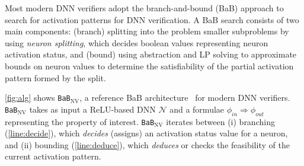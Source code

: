 \documentclass[oneside,11pt,dvipsnames]{book}
\newcommand{\nnproofformat}{\texttt{APTP}}
\newcommand{\dd}{\texttt{BaB$_{\text{NV}}$}}
\begin{document}
\begin{algorithm}[t]
{    }\label{line:dpllend}
    \Return{\unsat}
    
    \caption{The \dd{} algorithm.}\label{fig:alg}
\end{algorithm}

Most modern DNN verifiers adopt the branch-and-bound (BaB) approach to search for activation patterns for DNN verification. A BaB search consists of two main components: (branch) splitting into the problem smaller subproblems 
by using \emph{neuron splitting}, which decides boolean values representing neuron activation status, 
and (bound) using abstraction and LP solving to approximate bounds on neuron values to determine 
the satisfiability of the partial activation pattern formed by the split.


\autoref{fig:alg} shows \dd{}, a reference BaB architecture~\cite{nakagawa2014consolidating} for modern DNN verifiers. \dd{} takes as input a ReLU-based DNN $\mathcal{N}$ and a formulae $\phi_{in}\Rightarrow \phi_{out}$ representing the property of interest.
\dd{} iterates between (i) branching (\autoref{line:decide}), which \emph{decides} (assigns) an activation status value for a neuron, and (ii) bounding (\autoref{line:deduce}), which \emph{deduces} or checks the feasibility of the current activation pattern. 
\end{document}
